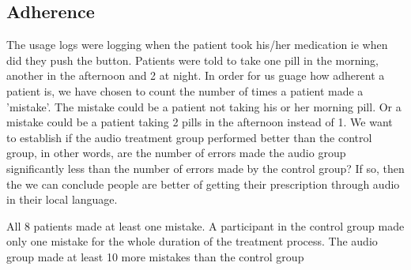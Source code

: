 \subsection{Adherence}
The usage logs were logging when the patient took his/her medication ie when did they push the button. Patients were told to take one pill in the morning, another in the afternoon and 2 at night. In order for us guage how adherent a patient is, we have chosen to count the number of times a patient made a 'mistake'. The mistake could be a patient not taking his or her morning pill. Or a mistake could be a patient taking 2 pills in the afternoon instead of 1. We want to establish if the audio treatment group performed better than the control group, in other words, are the number of errors made the audio group significantly less than the number of errors made by the control group? If so, then the we can conclude people are better of getting their prescription through audio in their local language.

All 8 patients made at least one mistake. A participant in the control group made only one mistake for the whole duration of the treatment process. The audio group made at least 10 more mistakes than the control group 
